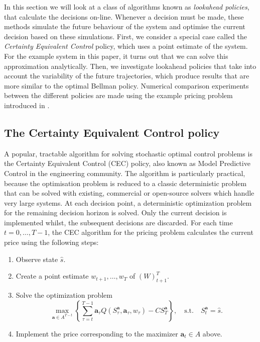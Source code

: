 \documentclass[main.tex]{subfiles}
\begin{document}
In this section we will look at a class of algorithms known as
\emph{lookahead policies}, that calculate the decisions on-line.
Whenever a decision must be made, these methods simulate the future
behaviour of the system and optimise the current decision based on
these simulations. First, we consider a special case called the
\emph{Certainty Equivalent Control} policy, which uses a point
estimate of the system. For the
example system in this paper, it turns out that we can solve
this approximation analytically.
Then, we investigate lookahead policies that take into account the
variability of the future trajectories, which produce
results that are more similar to the optimal Bellman policy.
Numerical comparison experiments between the different policies are
made using the example pricing problem introduced in
.

\subsection{The Certainty Equivalent Control policy}
A popular, tractable algorithm for solving stochastic optimal control
problems is the Certainty Equivalent Control (CEC) policy, also known as Model
Predictive Control in the engineering community.
The algorithm is particularly practical, because the optimisation
problem is reduced to a classic deterministic problem that can
be solved with existing, commercial or open-source solvers which
handle very large systems.
At each decision point, a deterministic optimization problem for the
remaining decision horizon is solved. Only the current decision is
implemented whilst, the subsequent decisions are discarded.
For each time $t=0,\dots,T-1$, the CEC algorithm for the pricing
problem calculates the current price using the following steps:
\begin{enumerate}
\item Observe state $\hat s$.
\item Create a point estimate $w_{t+1},\dots,w_T$ of ${(W)}_{t+1}^T$.
\item Solve the optimization problem
  \begin{equation}
    \max_{\mathbf a\in A^{T-t}}\left\{\sum_{\tau=t}^{T-1}\mathbf
      a_\tau Q(S_\tau^{\mathbf a},\mathbf
      a_\tau,w_{\tau})-CS_T^{\mathbf a}\right\},
    \quad \text{s.t.}\quad S_t^{\mathbf a}=\hat s.
  \end{equation}
\item Implement the price corresponding to the maximizer $\mathbf
  a_t\in A$ above.
\end{enumerate}
\end{document}
